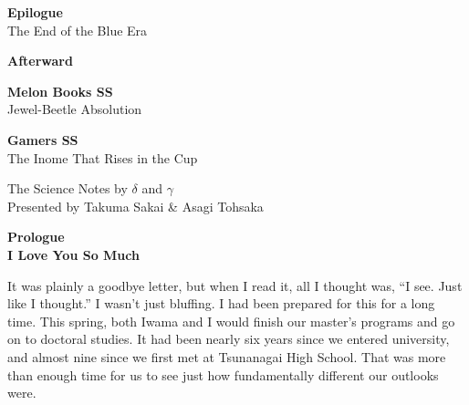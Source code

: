\documentclass[
    a4paper,
    12pt,
    twoside,
    openany,
    UTF8,
    fontset=windows
]{ctexbook}
\begin{document}
\begin{minipage}{0.88\textwidth}
\begin{flushleft}
\begin{list}{}
        \item \textbf{Epilogue} \dotfill \pageref{sec:epilogueV3} \\[-0.1ex]
        The End of the Blue Era
        
        \item \textbf{Afterward} \dotfill \pageref{sec:afterwordV3} \\[-0.1ex]
         
        \item \textbf{Melon Books SS}\dotfill \pageref{sec:melon} \\[-0.1ex]
        Jewel-Beetle Absolution

        \item \textbf{Gamers SS}\dotfill \pageref{sec:gamer}\\[-0.1ex]
        The Inome That Rises in the Cup
    \end{list}
    \end{flushleft}
    
    \vspace{0.9cm}
    
    \begin{flushleft}
    \footnotesize\color{gray}
    The Science Notes by $\delta$ and $\gamma$ \\[-0.1ex]
    Presented by Takuma Sakai \& Asagi Tohsaka
    \end{flushleft}
\end{minipage}
\hspace*{\fill}

\vspace*{0pt}
\clearpage

\newpage
\thispagestyle{empty}
\mbox{}
\newpage

\setcounter{page}{1}            %

\clearpage
\thispagestyle{plain}
\begin{center}
    \large\bfseries
    Prologue\\
    I Love You So Much
\end{center}
\label{sec:prologueV3}
\vspace{1cm}

It was plainly a goodbye letter, but when I read it, all I thought was, ``I see. Just like I thought.'' I wasn't just bluffing.
I had been prepared for this for a long time.
This spring, both Iwama and I would finish our master's programs and go on to doctoral studies. It had been nearly six years since we entered university, and almost nine since we first met at Tsunanagai High School. That was more than enough time for us to see just how fundamentally different our outlooks were.
\end{document}
